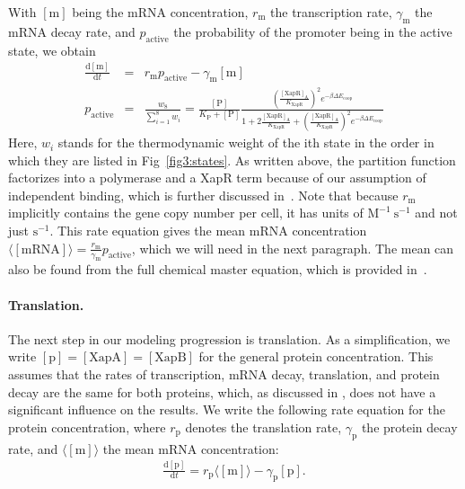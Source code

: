 \documentclass[10pt,letterpaper]{article}
\newcommand{\n}[1]{\mathrm{#1}}
\newcommand{\dd}[2]{\frac{\mathrm{d} #1}{\mathrm{d} #2}}
\begin{document}
	With $\n{[m]}$ being the mRNA concentration, $r_{\n{m}}$ the transcription
	rate, $\gamma_{\n{m}}$ the mRNA decay rate, and $p_{\n{active}}$ the
	probability of the promoter being in the active state, we obtain
	\begin{eqnarray}
	\label{eq:mbasic}
	\dd{\n{[m]}}{t} &=& r_{\n{m}} p_{\n{active}} - \gamma_{\n{m}} \n{[m]} \\
	p_{\n{active}} &=& \frac{w_8}{\sum_{i=1}^{8} w_i} = 
	\frac{\n{[P]}}{K_{\n{P}}+\n{[P]}} 
	\frac{
		\left( \frac{\mathrm{[XapR]_A}}{K_{\mathrm{XapR}}} \right)^2 
		e^{- \beta \Delta E_{\n{coop}}}
	}{
		1 + 
		2 \frac{\mathrm{[XapR]_A}}{K_{\mathrm{XapR}}} +
		\left( \frac{\mathrm{[XapR]_A}}{K_{\mathrm{XapR}}} \right)^2 e^{- \beta \Delta E_{\n{coop}}}
	}
	\end{eqnarray}
	Here, $w_i$ stands for the thermodynamic weight of the ith state in the
	order in which they are listed in Fig~\ref{fig3:states}. As written above,
	the partition function factorizes into a polymerase and a XapR term because
	of our assumption of independent binding, which is further discussed
	in~. Note that because $r_{\n{m}}$ implicitly contains the
	gene copy number per cell, it has units of $\n{M^{-1} \ s^{-1}}$ and not
	just $\n{s^{-1}}$. This rate equation gives the mean mRNA concentration
	$\langle\n{[mRNA]}\rangle = \frac{r_{\n{m}}}{\gamma_{\n{m}}}
	p_{\n{active}}$, which we will need in the next paragraph. The mean can also be found from the full chemical master equation, which is provided in~.
	
	\paragraph*{Translation.} 
	The next step in our modeling progression is translation. As a
	simplification, we write $\n{[p]}=\n{[XapA]=[XapB]}$ for the general protein
	concentration. This assumes that the rates of transcription, mRNA decay,
	translation, and protein decay are the same for both proteins, which, as
	discussed in , does not have a significant influence on the
	results. We write the following rate equation for the protein concentration,
	where $r_{\n{p}}$ denotes the translation rate, $\gamma_{\n{p}}$ the protein
	decay rate, and $\langle \n{[m]} \rangle$ the mean mRNA concentration:
	\begin{eqnarray}
	\label{eq:pbasic}
	\dd{\n{[p]}}{t} = r_{\n{p}} \langle \n{[m]} \rangle - \gamma_{\n{p}} \n{[p]}.
	\end{eqnarray}
	
\end{document}
